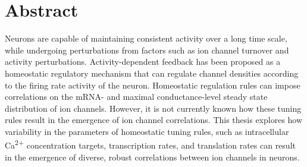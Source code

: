 \begingroup
\let\clearpage\relax
\let\cleardoublepage\relax
\let\cleardoublepage\relax

\chapter*{Abstract}
Neurons are capable of maintaining consistent activity over a long time scale, while undergoing perturbations from factors such as ion channel turnover and activity perturbations. Activity-dependent feedback has been proposed as a homeostatic regulatory mechanism that can regulate channel densities according to the firing rate activity of the neuron. Homeostatic regulation rules can impose correlations on the mRNA- and maximal conductance-level steady state distribution of ion channels. However, it is not currently known how these tuning rules result in the emergence of ion channel correlations. This thesis explores how variability in the parameters of homeostatic tuning rules, such as intracellular Ca\textsuperscript{2+} concentration targets, transcription rates, and translation rates can result in the emergence of diverse, robust correlations between ion channels in neurons.
\vfill

\endgroup

\vfill
